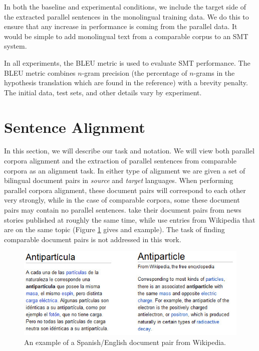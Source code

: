 In both the baseline and experimental conditions, we include the target side of
the extracted parallel sentences in the monolingual training data. We do this to
ensure that any increase in performance is coming from the parallel data. It
would be simple to add monolingual text from a comparable corpus to an SMT
system.

In all experiments, the BLEU metric \citep{Papineni02} is used to evaluate SMT
performance. The BLEU metric combines $n$-gram precision (the percentage of
$n$-grams in the hypothesis translation which are found in the reference) with a
brevity penalty.
The initial data, test sets, and other details vary by experiment.


\section{Sentence Alignment}
In this section, we will describe our task and notation.
We will view both parallel corpora alignment and the extraction of parallel
sentences from comparable corpora as an alignment task. In either type of
alignment we are given a set of bilingual document pairs in {\em source} and {\em
target} languages. When performing parallel corpora alignment, these document
pairs will correspond to each other very strongly, while in the case of
comparable corpora, some these document pairs may contain no parallel sentences.
\citet{Munteanu05} take their document pairs from news stories published at
roughly the same time, while \citet{Adafre06,Smith10} use entries from
Wikipedia that are on the same topic (Figure \ref{fig:wiki} gives and example).
The task of finding comparable document pairs is not addressed in this work.

\begin{figure}[ht]
\includegraphics[width=\textwidth]{images/wiki.jpg}
\caption{An example of a Spanish/English document pair from Wikipedia.}
\label{fig:wiki}
\end{figure}

